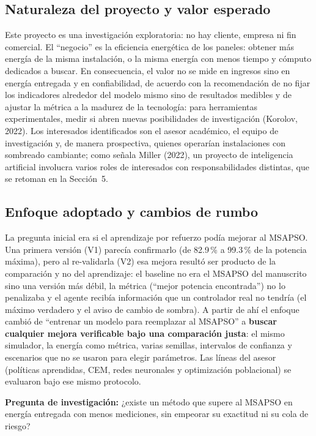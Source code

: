 \documentclass[letterpaper,11pt]{article}
\begin{document}
\subsection{Naturaleza del proyecto y valor esperado}
Este proyecto es una investigación exploratoria: no hay cliente, empresa ni fin comercial. El ``negocio'' es la eficiencia energética de los paneles: obtener más energía de la misma instalación, o la misma energía con menos tiempo y cómputo dedicados a buscar. En consecuencia, el valor no se mide en ingresos sino en energía entregada y en confiabilidad, de acuerdo con la recomendación de no fijar los indicadores alrededor del modelo mismo sino de resultados medibles y de ajustar la métrica a la madurez de la tecnología: para herramientas experimentales, medir si abren nuevas posibilidades de investigación (Korolov, 2022). Los interesados identificados son el asesor académico, el equipo de investigación y, de manera prospectiva, quienes operarían instalaciones con sombreado cambiante; como señala Miller (2022), un proyecto de inteligencia artificial involucra varios roles de interesados con responsabilidades distintas, que se retoman en la Sección~5.

\subsection{Enfoque adoptado y cambios de rumbo}
La pregunta inicial era si el aprendizaje por refuerzo podía mejorar al MSAPSO. Una primera versión (V1) parecía confirmarlo (de 82.9\,\% a 99.3\,\% de la potencia máxima), pero al re-validarla (V2) esa mejora resultó ser producto de la comparación y no del aprendizaje: el baseline no era el MSAPSO del manuscrito sino una versión más débil, la métrica (``mejor potencia encontrada'') no lo penalizaba y el agente recibía información que un controlador real no tendría (el máximo verdadero y el aviso de cambio de sombra). A partir de ahí el enfoque cambió de ``entrenar un modelo para reemplazar al MSAPSO'' a \textbf{buscar cualquier mejora verificable bajo una comparación justa}: el mismo simulador, la energía como métrica, varias semillas, intervalos de confianza y escenarios que no se usaron para elegir parámetros. Las líneas del asesor (políticas aprendidas, CEM, redes neuronales y optimización poblacional) se evaluaron bajo ese mismo protocolo.

\textbf{Pregunta de investigación:} ¿existe un método que supere al MSAPSO en energía entregada con menos mediciones, sin empeorar su exactitud ni su cola de riesgo?
\end{document}
